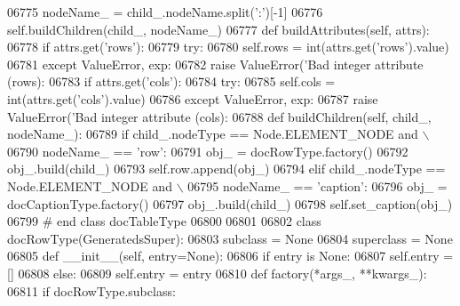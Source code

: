 \begin{DoxyCode}
{{{{{{{{{{{{{{{{{{{{{{{{{{{{{{{{{{{{{{{{{{{{{{{{{{{{{{{{{{{{{{{{{{{{{{{{{{{{{{{{{{{{{{{{{{{{{{{{{{{{{{{{{{{{{{{{{{{{{{{{{{{{{{{{{{{{{{{{{{{{{{{{{{{{{{{{{{{{{{{{{{{{{{{{{{{{{{{{{{{{{{{{{{{{{{{{{{{{{{{{{{{{{{{{{{{{{{{{{{{{{{{{{{{{{{{{{{{{{{{{{{{{{{{{{{{{{{{{{{{{{{{{{{{{{{{{{{{{{{{{{{{{{{{{{{{{{{{{{{{{{{{{{{{{{{{{{{{{{{{{{{{{{{{{{{{{{{{{{{{{{{{{{{{{{{{{{{{{{{{{{{{{{{{{{{{{{{{{{{{{{{{{{{{{{{{{{{{{{{{{{{{{{{{{{{{{{{{{{{{{06775             nodeName\_ = child\_.nodeName.split(\textcolor{stringliteral}{':'})[-1]
06776             self.buildChildren(child\_, nodeName\_)
06777     \textcolor{keyword}{def }buildAttributes(self, attrs):
06778         \textcolor{keywordflow}{if} attrs.get(\textcolor{stringliteral}{'rows'}):
06779             \textcolor{keywordflow}{try}:
06780                 self.rows = int(attrs.get(\textcolor{stringliteral}{'rows'}).value)
06781             \textcolor{keywordflow}{except} ValueError, exp:
06782                 \textcolor{keywordflow}{raise} ValueError(\textcolor{stringliteral}{'Bad integer attribute (rows): %
06783         \textcolor{keywordflow}{if} attrs.get(\textcolor{stringliteral}{'cols'}):
06784             \textcolor{keywordflow}{try}:
06785                 self.cols = int(attrs.get(\textcolor{stringliteral}{'cols'}).value)
06786             \textcolor{keywordflow}{except} ValueError, exp:
06787                 \textcolor{keywordflow}{raise} ValueError(\textcolor{stringliteral}{'Bad integer attribute (cols): %
06788     \textcolor{keyword}{def }buildChildren(self, child\_, nodeName\_):
06789         \textcolor{keywordflow}{if} child\_.nodeType == Node.ELEMENT\_NODE \textcolor{keywordflow}{and} \(\backslash\)
06790             nodeName\_ == \textcolor{stringliteral}{'row'}:
06791             obj\_ = docRowType.factory()
06792             obj\_.build(child\_)
06793             self.row.append(obj\_)
06794         \textcolor{keywordflow}{elif} child\_.nodeType == Node.ELEMENT\_NODE \textcolor{keywordflow}{and} \(\backslash\)
06795             nodeName\_ == \textcolor{stringliteral}{'caption'}:
06796             obj\_ = docCaptionType.factory()
06797             obj\_.build(child\_)
06798             self.set_caption(obj\_)
06799 \textcolor{comment}{# end class docTableType}
06800 
06801 
06802 \textcolor{keyword}{class }docRowType(GeneratedsSuper):
06803     subclass = \textcolor{keywordtype}{None}
06804     superclass = \textcolor{keywordtype}{None}
06805     \textcolor{keyword}{def }__init__(self, entry=None):
06806         \textcolor{keywordflow}{if} entry \textcolor{keywordflow}{is} \textcolor{keywordtype}{None}:
06807             self.entry = []
06808         \textcolor{keywordflow}{else}:
06809             self.entry = entry
06810     \textcolor{keyword}{def }factory(*args\_, **kwargs\_):
06811         \textcolor{keywordflow}{if} docRowType.subclass:
}}}}}}}}}}}}}}}}}}}}}}}}}}}}}}}}}}}}}}}}}}}}}}}}}}}}}}}}}}}}}}}}}}}}}}}}}}}}}}}}}}}}}}}}}}}}}}}}}}}}}}}}}}}}}}}}}}}}}}}}}}}}}}}}}}}}}}}}}}}}}}}}}}}}}}}}}}}}}}}}}}}}}}}}}}}}}}}}}}}}}}}}}}}}}}}}}}}}}}}}}}}}}}}}}}}}}}}}}}}}}}}}}}}}}}}}}}}}}}}}}}}}}}}}}}}}}}}}}}}}}}}}}}}}}}}}}}}}}}}}}}}}}}}}}}}}}}}}}}}}}}}}}}}}}}}}}}}}}}}}}}}}}}}}}}}}}}}}}}}}}}}}}}}}}}}}}}}}}}}}}}}}}}}}}}}}}}}}}}}}}}}}}}}}}}}}}}}}}}}}}}}}}}}}}}}}}}}}}}}}}}
\end{DoxyCode}
